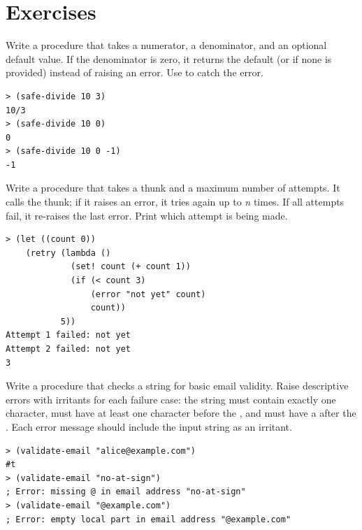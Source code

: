 \section*{Exercises}

\begin{exercise}
Write a  procedure that takes a numerator, a denominator, and an optional default value. If the denominator is zero, it returns the default (or  if none is provided) instead of raising an error. Use  to catch the error.

\begin{lstlisting}[style=repl]
> (safe-divide 10 3)
10/3
> (safe-divide 10 0)
0
> (safe-divide 10 0 -1)
-1
\end{lstlisting}
\end{exercise}

\begin{exercise}
Write a  procedure that takes a thunk and a maximum number of attempts. It calls the thunk; if it raises an error, it tries again up to \emph{n} times. If all attempts fail, it re-raises the last error. Print which attempt is being made.

\begin{lstlisting}[style=repl]
> (let ((count 0))
    (retry (lambda ()
             (set! count (+ count 1))
             (if (< count 3)
                 (error "not yet" count)
                 count))
           5))
Attempt 1 failed: not yet
Attempt 2 failed: not yet
3
\end{lstlisting}
\end{exercise}

\begin{exercise}
Write a  procedure that checks a string for basic email validity. Raise descriptive errors with irritants for each failure case: the string must contain exactly one  character, must have at least one character before the , and must have a  after the . Each error message should include the input string as an irritant.

\begin{lstlisting}[style=repl]
> (validate-email "alice@example.com")
#t
> (validate-email "no-at-sign")
; Error: missing @ in email address "no-at-sign"
> (validate-email "@example.com")
; Error: empty local part in email address "@example.com"
\end{lstlisting}
\end{exercise}

